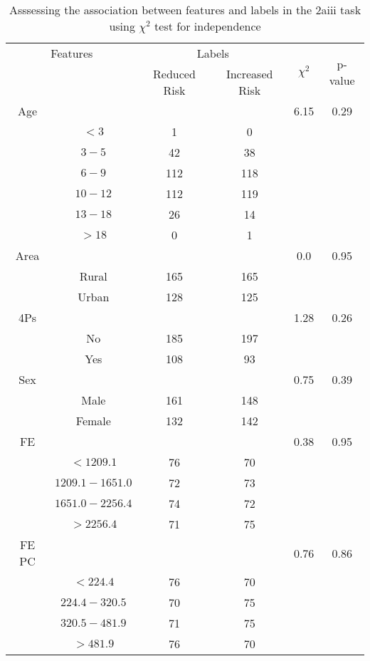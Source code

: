 \begin{table}[!htb]
\centering
\caption{Asssessing the association between features and labels in the 2aiii task using $\chi^2$ test for independence}
\label{tab:chitest_2aiii}
\begin{tabular}{c c | c c| c | c}
\hline
\multicolumn{2}{c|}{Features}& \multicolumn{2}{c|}{Labels}& \multirow{2}{*}{$\chi^2$} & \multirow{2}{*}{p-value}\\ 
& & Reduced Risk & Increased Risk & & \\ 
\hline
Age &  &  & & 6.15 & 0.29 \\ 
& $< 3$ & 1 & 0& & \\ 
& $3-5$ & 42 & 38& & \\ 
& $6-9$ & 112 & 118& & \\ 
& $10-12$ & 112 & 119& & \\ 
& $13-18$ & 26 & 14& & \\ 
& $> 18$ & 0 & 1& & \\ 
\hline 
Area &  &  & & 0.0 & 0.95 \\ 
& Rural & 165 & 165& & \\ 
& Urban & 128 & 125& & \\ 
\hline 
4Ps &  &  & & 1.28 & 0.26 \\ 
& No & 185 & 197& & \\ 
& Yes & 108 & 93& & \\ 
\hline 
Sex &  &  & & 0.75 & 0.39 \\ 
& Male & 161 & 148& & \\ 
& Female & 132 & 142& & \\ 
\hline 
FE &  &  & & 0.38 & 0.95 \\ 
& $< 1209.1$ & 76 & 70& & \\ 
& $1209.1-1651.0$ & 72 & 73& & \\ 
& $1651.0-2256.4$ & 74 & 72& & \\ 
& $> 2256.4$ & 71 & 75& & \\ 
\hline 
FE PC &  &  & & 0.76 & 0.86 \\ 
& $< 224.4$ & 76 & 70& & \\ 
& $224.4-320.5$ & 70 & 75& & \\ 
& $320.5-481.9$ & 71 & 75& & \\ 
& $> 481.9$ & 76 & 70& & \\ 
\hline 
\end{tabular}
\end{table}
